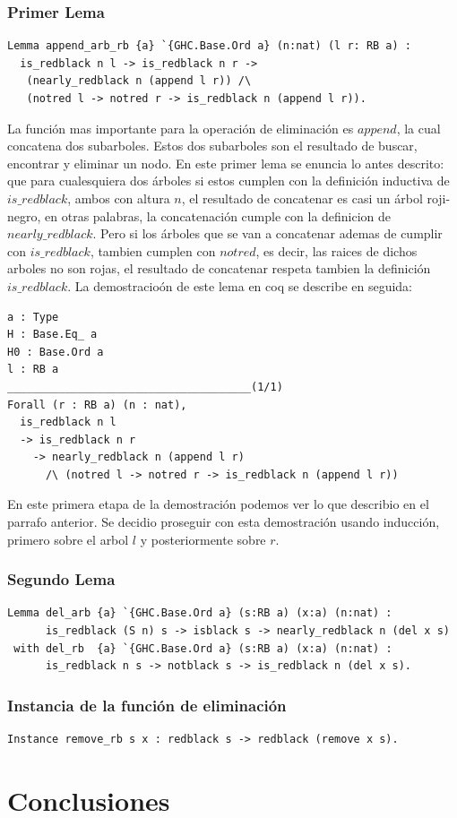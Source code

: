 \documentclass[8pt,leqno,pdflatex,spanish]{book}
\newcommand{\arn}{árbol roji-negro}
\theoremstyle{plain}
\theoremstyle{definition}
\theoremstyle{remark}
\begin{document}
\subsection{Primer Lema}
\begin{verbatim}
Lemma append_arb_rb {a} `{GHC.Base.Ord a} (n:nat) (l r: RB a) : 
  is_redblack n l -> is_redblack n r ->
   (nearly_redblack n (append l r)) /\
   (notred l -> notred r -> is_redblack n (append l r)).
\end{verbatim}

La funci\'on mas importante para la operaci\'on de eliminaci\'on es $append$, la cual concatena 
dos subarboles. Estos dos subarboles son el resultado de buscar, encontrar y eliminar un nodo. En 
este primer lema se enuncia lo antes descrito: que para cualesquiera dos \'arboles si estos 
cumplen con la definici\'on inductiva de $is\_redblack$, ambos con altura $n$, el resultado de 
concatenar es casi un {\arn}, en otras palabras, la concatenaci\'on cumple con la definicion de 
$nearly\_redblack$. Pero si los \'arboles que se van a concatenar ademas de cumplir con 
$is\_redblack$, tambien cumplen con $notred$, es decir, las raices de dichos arboles no son rojas, 
el resultado de concatenar respeta tambien la definici\'on $is\_redblack$. La demostracio\'on de 
este lema en coq se describe en seguida:
\begin{verbatim}
a : Type
H : Base.Eq_ a
H0 : Base.Ord a
l : RB a
______________________________________(1/1)
Forall (r : RB a) (n : nat),
  is_redblack n l
  -> is_redblack n r
    -> nearly_redblack n (append l r)
      /\ (notred l -> notred r -> is_redblack n (append l r))
\end{verbatim}
En este primera etapa de la demostraci\'on podemos ver lo que describio en el parrafo anterior. Se decidio proseguir con esta demostraci\'on usando inducci\'on, primero sobre el arbol $l$ y posteriormente sobre $r$.

\subsection{Segundo Lema}
\begin{verbatim}
Lemma del_arb {a} `{GHC.Base.Ord a} (s:RB a) (x:a) (n:nat) :
      is_redblack (S n) s -> isblack s -> nearly_redblack n (del x s)
 with del_rb  {a} `{GHC.Base.Ord a} (s:RB a) (x:a) (n:nat) :
      is_redblack n s -> notblack s -> is_redblack n (del x s).
\end{verbatim}

\subsection{Instancia de la funci\'on de eliminaci\'on}
\begin{verbatim}
Instance remove_rb s x : redblack s -> redblack (remove x s).
\end{verbatim}
\chapter{Conclusiones}  
\backmatter%
\end{document}
